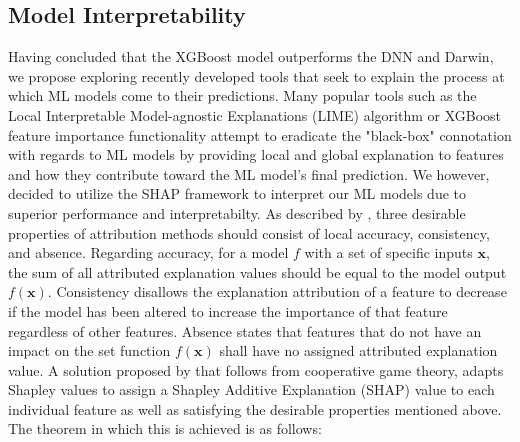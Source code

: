 \documentclass[]{interact}
\theoremstyle{plain}%
\theoremstyle{definition}
\theoremstyle{remark}
\begin{document}
\subsection{Model Interpretability}\label{Subsection:ModelInterpretability}
Having concluded that the XGBoost model outperforms the DNN and Darwin, we propose exploring recently developed tools that seek to explain the process at which ML models come to their predictions. Many popular tools such as the Local Interpretable Model-agnostic Explanations (LIME) algorithm \citep{MAR16} or XGBoost feature importance functionality attempt to eradicate the "black-box" connotation with regards to ML models by providing local and global explanation to features and how they contribute toward the ML model's final prediction. We however, decided to utilize the SHAP framework \citep{LUN17} to interpret our ML models due to superior performance and interpretabilty. As described by \cite{LUN19}, three desirable properties of attribution methods should consist of local accuracy, consistency, and absence. Regarding accuracy, for a model $f$ with a set of specific inputs $\boldsymbol{x}$, the sum of all attributed explanation values should be equal to the model output $f(\boldsymbol{x})$. Consistency disallows the explanation attribution of a feature to decrease if the model has been altered to increase the importance of that feature regardless of other features. Absence states that features that do not have an impact on the set function $f(\boldsymbol{x})$ shall have no assigned attributed explanation value. A solution proposed by \cite{LUN19} that follows from cooperative game theory, adapts Shapley values \citep{SHA53} to assign a Shapley Additive Explanation (SHAP) value to each individual feature as well as satisfying the desirable properties mentioned above. The theorem in which this is achieved is as follows:
\end{document}
